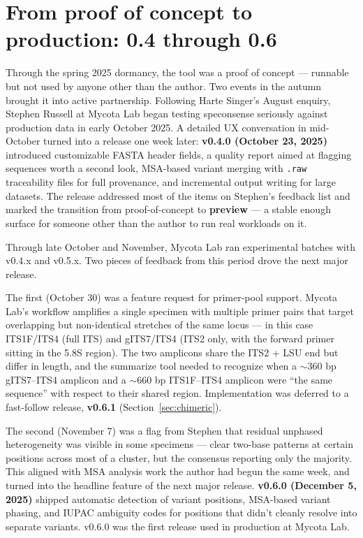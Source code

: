 \documentclass[11pt]{article}
\begin{document}
\section{From proof of concept to production: 0.4 through 0.6}

Through the spring 2025 dormancy, the tool was a proof of concept ---
runnable but not used by anyone other than the author. Two events in the
autumn brought it into active partnership. Following Harte Singer's
August enquiry, Stephen Russell at Mycota Lab began testing speconsense
seriously against production data in early October 2025. A detailed UX conversation in mid-October turned into a release one week
later: \textbf{v0.4.0 (October 23, 2025)} introduced customizable FASTA header
fields, a quality report aimed at flagging sequences worth a second look,
MSA-based variant merging with \texttt{.raw} traceability files for full
provenance, and incremental output writing for large datasets. The release
addressed most of the items on Stephen's feedback list and marked the
transition from proof-of-concept to \textbf{preview} --- a stable enough
surface for someone other than the author to run real workloads on it.

Through late October and November, Mycota Lab ran experimental batches with
v0.4.x and v0.5.x. Two pieces of feedback from this period drove the next
major release.

The first (October 30) was a feature request for primer-pool support. Mycota
Lab's workflow amplifies a single specimen with multiple primer pairs that
target overlapping but non-identical stretches of the same locus --- in this
case ITS1F/ITS4 (full ITS) and gITS7/ITS4 (ITS2 only, with the forward primer
sitting in the 5.8S region). The two amplicons share the ITS2 + LSU end but
differ in length, and the summarize tool needed to recognize when a $\sim$360
bp gITS7--ITS4 amplicon and a $\sim$660 bp ITS1F--ITS4 amplicon were ``the
same sequence'' with respect to their shared region. Implementation was
deferred to a fast-follow release, \textbf{v0.6.1} (Section~\ref{sec:chimeric}).

The second (November 7) was a flag from Stephen that residual unphased
heterogeneity was visible in some specimens --- clear two-base patterns at
certain positions across most of a cluster, but the consensus reporting only
the majority. This aligned with MSA analysis work the author had begun the
same week, and turned into the headline feature of the next major release.
\textbf{v0.6.0 (December 5, 2025)} shipped automatic detection of variant
positions, MSA-based variant phasing, and IUPAC ambiguity codes for positions
that didn't cleanly resolve into separate variants. v0.6.0 was the first
release used in production at Mycota Lab.
\end{document}
